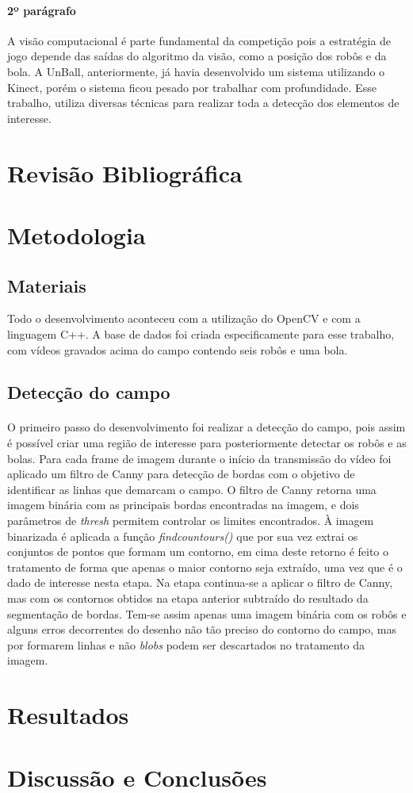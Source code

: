 \documentclass[conference, harvard, brazil, english]{sbatex}
\begin{document}
		\paragraph{2º parágrafo}
		A visão computacional é parte fundamental da competição pois a estratégia de jogo depende das saídas do algoritmo da visão, como a posição dos robôs e da bola. A UnBall, anteriormente, já havia desenvolvido um sistema utilizando o Kinect, porém o sistema ficou pesado por trabalhar com profundidade. Esse trabalho, utiliza diversas técnicas para realizar toda a detecção dos elementos de interesse.
		
	\section{Revisão Bibliográfica}
	
	\section{Metodologia}
		\subsection{Materiais}
		Todo o desenvolvimento aconteceu com a utilização do OpenCV e com a linguagem C++. A base de dados foi criada especificamente para esse trabalho, com vídeos gravados acima do campo contendo seis robôs e uma bola.
		\subsection{Detecção do campo}
		\paragraph{}
		O primeiro passo do desenvolvimento foi realizar a detecção do campo, pois assim é possível criar uma região de interesse para posteriormente detectar os robôs e as bolas. Para cada frame de imagem durante o início da transmissão do vídeo foi aplicado um filtro de Canny para detecção de bordas com o objetivo de identificar as linhas que demarcam o campo. O filtro de Canny retorna uma imagem binária com as principais bordas encontradas na imagem, e dois parâmetros de \textit{thresh} permitem controlar os limites encontrados. À imagem binarizada é aplicada a função \textit{findcountours()} que por sua vez extrai os conjuntos de pontos que formam um contorno, em cima deste retorno é feito o tratamento de forma que apenas o maior contorno seja extraído, uma vez que é o dado de interesse nesta etapa.
		Na etapa continua-se a aplicar o filtro de Canny, mas com os contornos obtidos na etapa anterior subtraído do resultado da segmentação de bordas. Tem-se assim apenas uma imagem binária com os robôs e alguns erros decorrentes do desenho não tão preciso do contorno do campo, mas por formarem linhas e não \textit{blobs} podem ser descartados no tratamento da imagem.
	\section{Resultados}
			
	\section{Discussão e Conclusões}
	
\end{document}
